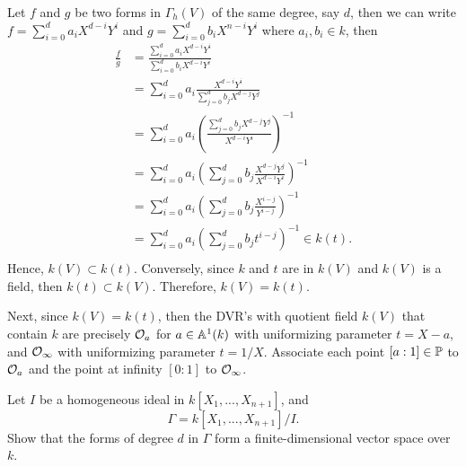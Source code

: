 \begin{solution}
    Let $f$ and $g$ be two forms in $\Gamma_h(V)$ of the same degree, say $d$, then we can write $f = \sum_{i=0}^{d}a_i X^{d-i}Y^i$ and $g = \sum_{i=0}^{d}b_iX^{n-i}Y^i$ where $a_i, b_i \in k$, then
    \begin{align*}
        \frac{f}{g} &= \frac{\sum_{i=0}^{d}a_i X^{d-i}Y^i}{\sum_{i=0}^{d}b_i X^{d-i}Y^i} \\
        &= \sum_{i=0}^{d}a_i\frac{X^{d-i}Y^i}{\sum_{j=0}^{d}b_j X^{d-j}Y^j} \\
        &= \sum_{i=0}^{d}a_i\left(\frac{\sum_{j=0}^{d}b_j X^{d-j}Y^j}{X^{d-i}Y^i}\right)^{-1} \\
        &= \sum_{i=0}^{d}a_i\left(\sum_{j=0}^{d}b_j\frac{X^{d-j}Y^j}{X^{d-i}Y^i}\right)^{-1} \\
        &= \sum_{i=0}^{d}a_i\left(\sum_{j=0}^{d}b_j\frac{X^{i-j}}{Y^{i-j}}\right)^{-1} \\
        &= \sum_{i=0}^{d}a_i\left(\sum_{j=0}^{d}b_j t^{i-j}\right)^{-1} \in k(t).\\
    \end{align*}
    Hence, $k(V) \subset k(t)$. Conversely, since $k$ and $t$ are in $k(V)$ and $k(V)$ is a field, then $k(t) \subset k(V)$. Therefore, $k(V) = k(t)$. 

    Next, since $k(V) = k(t)$, then the DVR's with quotient field $k(V)$ that contain $k$ are precisely $\O_a$ for $a \in \A^1(k)$ with uniformizing parameter $t = X - a$, and $\O_{\infty}$ with uniformizing parameter $t = 1/X$. Associate each point $[a : 1] \in \P$ to $\O_a$ and the point at infinity $[0 : 1]$ to $\O_{\infty}$. \\
\end{solution}

\begin{exercise}
    Let $I$ be a homogeneous ideal in $k[X_1, ..., X_{n+1}]$, and
    $$\Gamma = k[X_1, ..., X_{n+1}]/I.$$
    Show that the forms of degree $d$ in $\Gamma$ form a finite-dimensional vector space over $k$. \\
\end{exercise}

\begin{solution}
    \td \\
\end{solution}

\begin{exercise}
    \td \\
\end{exercise}

